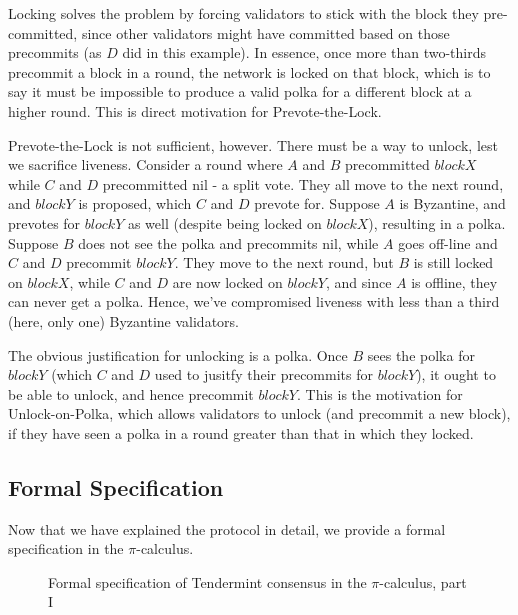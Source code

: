 Locking solves the problem by forcing validators to stick with the block they pre-committed, 
since other validators might have committed based on those precommits (as $D$ did in this example).
In essence, once more than two-thirds precommit a block in a round, the network is locked on that block,
which is to say it must be impossible to produce a valid polka for a different block at a higher round.
This is direct motivation for Prevote-the-Lock.

Prevote-the-Lock is not sufficient, however. 
There must be a way to unlock, lest we sacrifice liveness.
Consider a round where $A$ and $B$ precommitted $blockX$ while $C$ and $D$ precommitted nil - a split vote.
They all move to the next round, and $blockY$ is proposed, which $C$ and $D$ prevote for.
Suppose $A$ is Byzantine, and prevotes for $blockY$ as well (despite being locked on $blockX$), resulting in a polka.
Suppose $B$ does not see the polka and precommits nil, while $A$ goes off-line and $C$ and $D$ precommit $blockY$. 
They move to the next round, but $B$ is still locked on $blockX$, while $C$ and $D$ are now locked on $blockY$, 
and since $A$ is offline, they can never get a polka. 
Hence, we've compromised liveness with less than a third (here, only one) Byzantine validators.

The obvious justification for unlocking is a polka. 
Once $B$ sees the polka for $blockY$ (which $C$ and $D$ used to jusitfy their precommits for $blockY$), 
it ought to be able to unlock, and hence precommit $blockY$.
This is the motivation for Unlock-on-Polka, 
which allows validators to unlock (and precommit a new block),
if they have seen a polka in a round greater than that in which they locked.

\subsection{Formal Specification}

Now that we have explained the protocol in detail, 
we provide a formal specification in the $\pi$-calculus.

\begin{figure}[]
    	\centering
	
	\caption[Formal specification of Tendermint consensus in the $\pi$-calculus, part I]{Formal specification of Tendermint consensus in the $\pi$-calculus, part I}
	\label{fig:tendermint_pi1}
\end{figure}

